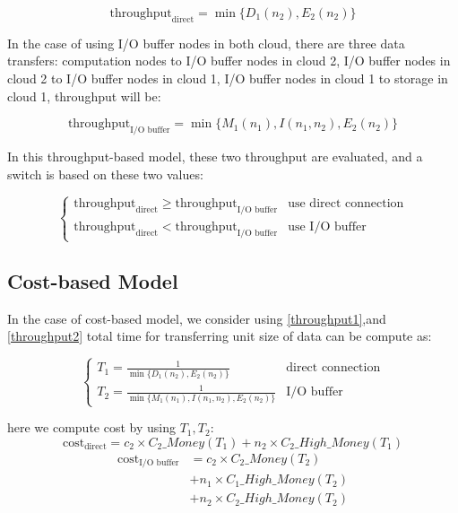 \documentclass[JIP,draft]{ipsj}
\begin{document}
\begin{equation}
	\text{throughput}_{\text{direct}}=\min\{D_1(n_2),E_2(n_2)\} \label{throughput1}
\end{equation}

In the case of using I/O buffer nodes in both cloud, there are three data transfers: computation nodes to I/O buffer nodes in cloud 2, I/O buffer nodes in cloud 2 to I/O buffer nodes in cloud 1, I/O buffer nodes in cloud 1 to storage in cloud 1, throughput will be:

\begin{equation}
	\text{throughput}_{\text{I/O buffer}}=\min\{M_1(n_1),I(n_1,n_2),E_2(n_2)\} \label{throughput2}
\end{equation}

In this throughput-based model, these two throughput are evaluated, and a switch is based on these two values:

\begin{equation}
	\begin{cases}
		\text{throughput}_{\text{direct}} \geq \text{throughput}_{\text{I/O buffer}} & \text{use direct connection}\\
		\text{throughput}_{\text{direct}} < \text{throughput}_{\text{I/O buffer}} & \text{use I/O buffer}
	\end{cases}
\end{equation}

\subsection{Cost-based Model}
In the case of cost-based model, we consider
using \ref{throughput1},and \ref{throughput2} total time for transferring unit size of data can be compute as:

\begin{equation}
	\begin{cases}
		T_1=\frac{1}{\min\{D_1(n_2),E_2(n_2)\}} & \text{direct connection}\\
		T_2=\frac{1}{\min\{M_1(n_1),I(n_1,n_2),E_2(n_2)\}} &\text{I/O buffer}
	\end{cases}
\end{equation}

here we compute cost by using $T_1,T_2$:
\begin{equation}
	\text{cost}_\text{direct}=c_2\times C_2\_Money(T_1)+n_2\times C_2\_High\_Money(T_1)
\end{equation}
\begin{align}
	\text{cost}_\text{I/O buffer}&=c_2\times C_2\_Money(T_2)\\\nonumber 
				     &+n_1\times C_1\_High\_Money(T_2)\\ \nonumber
				     &+n_2\times C_2\_High\_Money(T_2)
\end{align}
\end{document}
